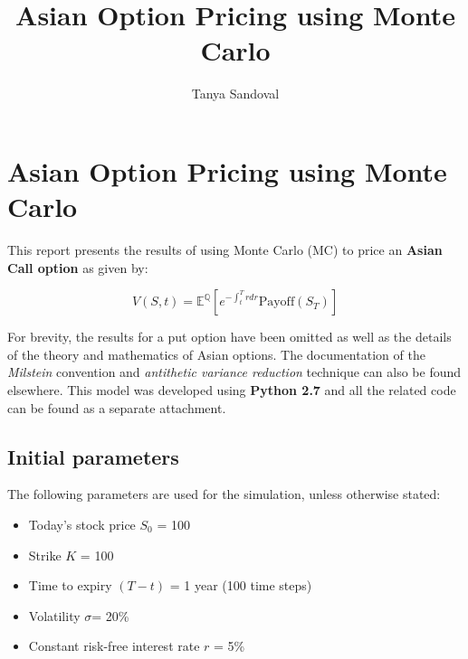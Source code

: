\documentclass{article}
\title{Asian Option Pricing using Monte Carlo}
\author{Tanya Sandoval}
\providecommand{\tightlist}{%
      \setlength{\itemsep}{0pt}\setlength{\parskip}{0pt}}
\begin{document}
    
    
    \maketitle
    
    

    
    \section{Asian Option Pricing using Monte
Carlo}\label{asian-option-pricing-using-monte-carlo}

This report presents the results of using Monte Carlo (MC) to price an
\textbf{Asian Call option} as given by:

\begin{equation}
V(S, t) = \mathbb{E}^\mathbb{Q} [e^{-\int^T_t rdr} \mathrm{Payoff}(S_T)] 
\end{equation}

For brevity, the results for a put option have been omitted as well as the details of the theory and mathematics of Asian options. The documentation of the {\it{Milstein}} convention and {\it antithetic variance reduction} technique can also be found elsewhere. This model was developed using {\textbf{Python 2.7}} and all the related code can be found as a separate attachment. 

    \subsection{Initial parameters}\label{initial-parameters}

The following parameters are used for the simulation, unless otherwise
stated:

\begin{itemize}
\tightlist
\item
  Today's stock price $S_0$ = 100
\item
  Strike $K$ = 100
\item
  Time to expiry $(T-t)$ = 1 year (100 time steps)
\item
  Volatility $\sigma$= 20\%
\item
  Constant risk-free interest rate $r$ = 5\%
\end{itemize}
\end{document}
